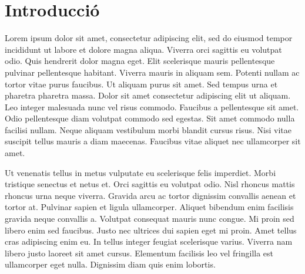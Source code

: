 \section{Introducció}\label{sec:intro}


Lorem ipsum dolor sit amet, consectetur adipiscing elit, sed do eiusmod tempor incididunt ut labore et dolore magna aliqua. Viverra orci sagittis eu volutpat odio. Quis hendrerit dolor magna eget. Elit scelerisque mauris pellentesque pulvinar pellentesque habitant. Viverra mauris in aliquam sem. Potenti nullam ac tortor vitae purus faucibus. Ut aliquam purus sit amet. Sed tempus urna et pharetra pharetra massa. Dolor sit amet consectetur adipiscing elit ut aliquam. Leo integer malesuada nunc vel risus commodo. Faucibus a pellentesque sit amet. Odio pellentesque diam volutpat commodo sed egestas. Sit amet commodo nulla facilisi nullam. Neque aliquam vestibulum morbi blandit cursus risus. Nisi vitae suscipit tellus mauris a diam maecenas. Faucibus vitae aliquet nec ullamcorper sit amet.

Ut venenatis tellus in metus vulputate eu scelerisque felis
imperdiet. Morbi tristique senectus et netus et. Orci sagittis eu
volutpat odio. Nisl rhoncus mattis rhoncus urna neque viverra. Gravida
arcu ac tortor dignissim convallis aenean et tortor at. Pulvinar
sapien et ligula ullamcorper. Aliquet bibendum enim facilisis gravida
neque convallis a. Volutpat consequat mauris nunc congue. Mi proin sed
libero enim sed faucibus. Justo nec ultrices dui sapien eget mi
proin. Amet tellus cras adipiscing enim eu. In tellus integer feugiat
scelerisque varius. Viverra nam libero justo laoreet sit amet
cursus. Elementum facilisis leo vel fringilla est ullamcorper eget
nulla. Dignissim diam quis enim lobortis.
